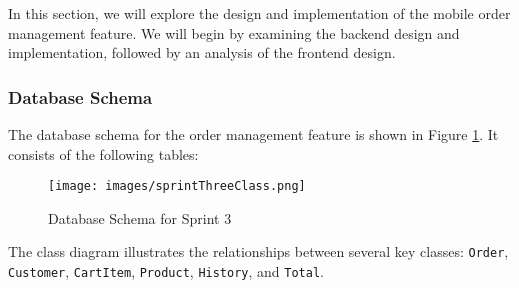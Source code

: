In this section, we will explore the design and implementation of the mobile order management feature. We will begin by examining the backend design and implementation, followed by an analysis of the frontend design.

\subsubsection{Database Schema}

The database schema for the order management feature is shown in Figure \ref{fig:db_schema_sprint3}. It consists of the following tables:

\begin{figure}[H]
    \centering
    \texttt{[image: images/sprintThreeClass.png]}
    \caption{Database Schema for Sprint 3}
    \label{fig:db_schema_sprint3}
\end{figure}

The class diagram illustrates the relationships between several key classes: \texttt{Order}, \texttt{Customer}, \texttt{CartItem}, \texttt{Product}, \texttt{History}, and \texttt{Total}.

